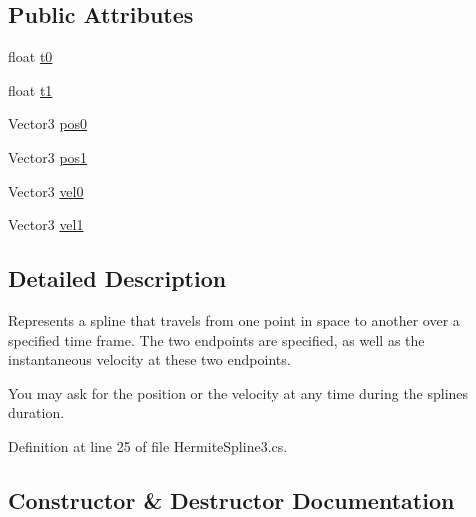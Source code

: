 \subsection*{Public Attributes}
\begin{DoxyCompactItemize}
\item 
float \mbox{\hyperlink{struct_leap_1_1_unity_1_1_animation_1_1_hermite_spline3_ae125e3515a0885a2d2f38b28ba426b3d}{t0}}
\item 
float \mbox{\hyperlink{struct_leap_1_1_unity_1_1_animation_1_1_hermite_spline3_a8378d6b2ba56008b87d178cca88716bf}{t1}}
\item 
Vector3 \mbox{\hyperlink{struct_leap_1_1_unity_1_1_animation_1_1_hermite_spline3_ab9901f2a45abfb1155ce0df806e6530a}{pos0}}
\item 
Vector3 \mbox{\hyperlink{struct_leap_1_1_unity_1_1_animation_1_1_hermite_spline3_a249eaf51c265148a63ef2b0d395bc9c2}{pos1}}
\item 
Vector3 \mbox{\hyperlink{struct_leap_1_1_unity_1_1_animation_1_1_hermite_spline3_a128d6140e17943ca3f1012404a8eaece}{vel0}}
\item 
Vector3 \mbox{\hyperlink{struct_leap_1_1_unity_1_1_animation_1_1_hermite_spline3_ab77b29135690ffc6f3671418100be381}{vel1}}
\end{DoxyCompactItemize}


\subsection{Detailed Description}
Represents a spline that travels from one point in space to another over a specified time frame. The two endpoints are specified, as well as the instantaneous velocity at these two endpoints. 

You may ask for the position or the velocity at any time during the splines duration. 

Definition at line 25 of file Hermite\+Spline3.\+cs.



\subsection{Constructor \& Destructor Documentation}
\mbox{\label{struct_leap_1_1_unity_1_1_animation_1_1_hermite_spline3_a77e7a488f4b70ba103d08bb47e223d25}} 
